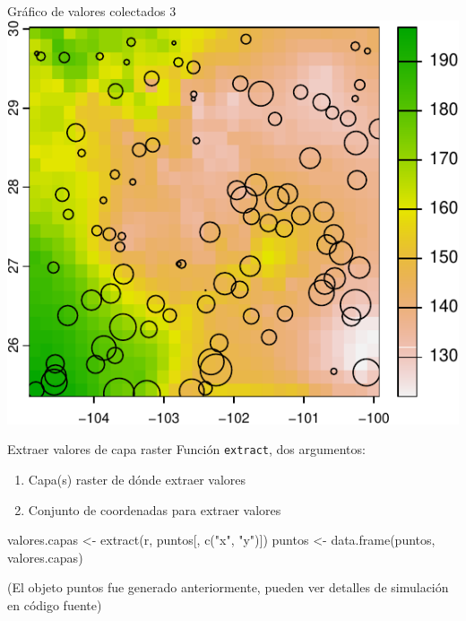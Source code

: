\documentclass[
  11pt,
  ignorenonframetext,
]{beamer}
\newenvironment{Shaded}{}{}
\newcommand{\FunctionTok}[1]{\textcolor[rgb]{0.02,0.16,0.49}{#1}}
\newcommand{\NormalTok}[1]{#1}
\newcommand{\OtherTok}[1]{\textcolor[rgb]{0.00,0.44,0.13}{#1}}
\newcommand{\StringTok}[1]{\textcolor[rgb]{0.25,0.44,0.63}{#1}}
\begin{document}
\begin{frame}{Gráfico de valores colectados 3}
\protect\hypertarget{gruxe1fico-de-valores-colectados-3}{}
\includegraphics{Correlacion-espacial_files/figure-beamer/unnamed-chunk-10-1.pdf}
\end{frame}

\begin{frame}[fragile]{Extraer valores de capa raster}
\protect\hypertarget{extraer-valores-de-capa-raster}{}
Función \texttt{extract}, dos argumentos:

\begin{enumerate}
\item
  Capa(s) raster de dónde extraer valores
\item
  Conjunto de coordenadas para extraer valores
\end{enumerate}

\begin{Shaded}
\begin{Highlighting}[]
\NormalTok{valores.capas }\OtherTok{\textless{}{-}} \FunctionTok{extract}\NormalTok{(r, puntos[, }\FunctionTok{c}\NormalTok{(}\StringTok{"x"}\NormalTok{, }\StringTok{"y"}\NormalTok{)])}
\NormalTok{puntos }\OtherTok{\textless{}{-}} \FunctionTok{data.frame}\NormalTok{(puntos, valores.capas)}
\end{Highlighting}
\end{Shaded}

(El objeto puntos fue generado anteriormente, pueden ver detalles de
simulación en código fuente)
\end{frame}
\end{document}
